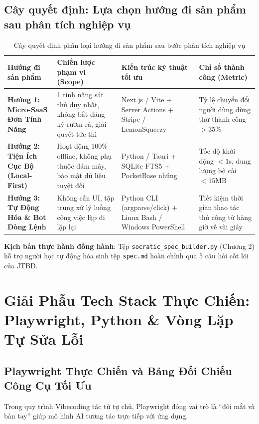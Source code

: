 \documentclass[a4paper,11pt]{report}
\begin{document}
\section{Cây quyết định: Lựa chọn hướng đi sản phẩm sau phân tích nghiệp vụ}

\begin{table}[htbp]
\centering
\small
\caption{Cây quyết định phân loại hướng đi sản phẩm sau bước phân tích nghiệp vụ}
\vspace{0.5em}
\begin{tabularx}{\textwidth}{L{3.2cm} L{3.8cm} L{4.5cm} Y}
\toprule
\textbf{Hướng đi sản phẩm} & \textbf{Chiến lược phạm vi (Scope)} & \textbf{Kiến trúc kỹ thuật tối ưu} & \textbf{Chỉ số thành công (Metric)} \\
\midrule
\textbf{Hướng 1: Micro-SaaS Đơn Tính Năng} & 1 tính năng sát thủ duy nhất, không bắt đăng ký rườm rà, giải quyết tức thì & Next.js / Vite + Server Actions + Stripe / LemonSqueezy & Tỷ lệ chuyển đổi người dùng dùng thử thành công $> 35\%$ \\
\textbf{Hướng 2: Tiện Ích Cục Bộ (Local-First)} & Hoạt động 100\% offline, không phụ thuộc đám mây, bảo mật dữ liệu tuyệt đối & Python / Tauri + SQLite FTS5 + PocketBase nhúng & Tốc độ khởi động $< 1$s, dung lượng bộ cài $< 15$MB \\
\textbf{Hướng 3: Tự Động Hóa \& Bot Dòng Lệnh} & Không cần UI, tập trung xử lý luồng công việc lặp đi lặp lại & Python CLI (argparse/click) + Linux Bash / Windows PowerShell & Tiết kiệm thời gian thao tác thủ công từ hàng giờ về vài giây \\
\bottomrule
\end{tabularx}
\end{table}

\noindent\textbf{Kịch bản thực hành đồng hành}: Tệp \texttt{socratic\_spec\_builder.py} (Chương 2) hỗ trợ người học tự động hóa sinh tệp \texttt{spec.md} hoàn chỉnh qua 5 câu hỏi cốt lõi của JTBD.

\chapter{Giải Phẫu Tech Stack Thực Chiến: Playwright, Python \& Vòng Lặp Tự Sửa Lỗi}

\section{Playwright Thực Chiến và Bảng Đối Chiếu Công Cụ Tối Ưu}
Trong quy trình Vibecoding tác tử tự chủ, Playwright đóng vai trò là ``đôi mắt và bàn tay'' giúp mô hình AI tương tác trực tiếp với ứng dụng.
\end{document}
